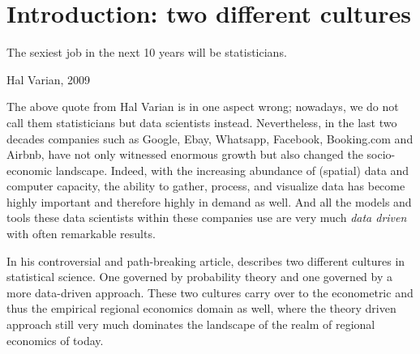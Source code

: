 \documentclass[fleqn,10pt]{SelfArx} %
\affiliation{\textsuperscript{1}\textit{Department of Spatial Economics, Vrije Universiteit Amsterdam, Amsterdam, The Netherlands}} %
\affiliation{*\textbf{Corresponding author}: \Letter{} t.de.graaff@vu.n; \Mundus{} \href{thomasdegraaff.nl}{thomasdegraaff.nl}} %
\begin{document}
\flushbottom %
\maketitle %
\tableofcontents %
\thispagestyle{empty} %


\section*{Introduction: two different cultures} %


\epigraph{The sexiest job in the next 10 years will be statisticians.}{Hal Varian, 2009}

The above quote from Hal Varian is in one aspect wrong; nowadays, we do not call them statisticians but data scientists instead. Nevertheless, in the last two decades companies such as Google, Ebay, Whatsapp, Facebook, Booking.com and Airbnb, have not only witnessed enormous growth but also changed the socio-economic landscape. Indeed, with the increasing abundance of (spatial) data and computer capacity, the ability to gather, process, and visualize data has become highly important and therefore highly in demand as well. And all the models and tools these data scientists within these companies use are very much \textit{data driven} with often remarkable results. 

In his controversial and path-breaking article, \citet{breiman2001statistical} describes two different cultures in statistical science. One governed by probability theory and one governed by a more data-driven approach. These two cultures carry over to the econometric and thus the empirical regional economics domain as well, where the theory driven approach still very much dominates the landscape of the realm of regional economics of today. 
\end{document}
